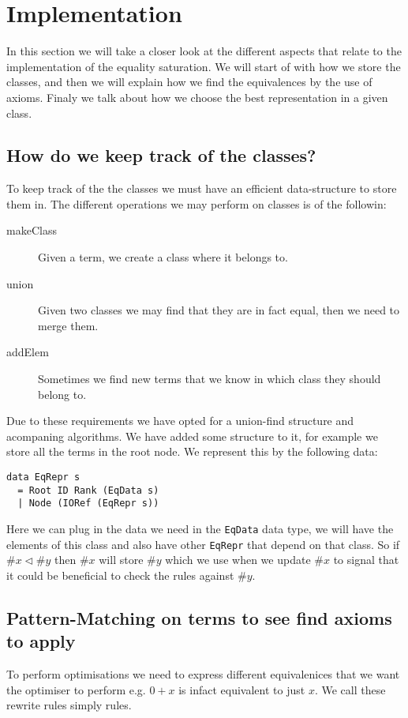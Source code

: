 
\section{Implementation}
In this section we will take a closer look at the different aspects that relate
to the implementation of the equality saturation. We will start of with how
we store the classes, and then we will explain how we find the equivalences by 
the use of axioms. Finaly we talk about how we choose the best representation in
a given class.
\subsection{How do we keep track of the classes?}
To keep track of the the classes we must have an efficient data-structure to store
them in. The different operations we may perform on classes is of the followin:

\begin{description}
  \item[makeClass] Given a term, we create a class where it belongs to.
  \item[union]     Given two classes we may find that they are in fact equal, then
                   we need to merge them.
  \item[addElem]   Sometimes we find new terms that we know in which class they
                   should belong to.
\end{description}

Due to these requirements we have opted for a union-find structure and acompaning
algorithms. We have added some structure to it, for example we store all the terms
in the root node. We represent this by the following data:

\begin{verbatim}
data EqRepr s
  = Root ID Rank (EqData s)
  | Node (IORef (EqRepr s))
\end{verbatim}

Here we can plug in the data we need in the \verb|EqData| data type, we will have
the elements of this class and also have other \verb|EqRepr| that depend on that
class. So if $\#x \lhd \#y$ then $\#x$ will store $\#y$ which we use when we update
$\#x$ to signal that it could be beneficial to check the rules against $\#y$.

\subsection{Pattern-Matching on terms to see find axioms to apply}
To perform optimisations we need to express different equivalenices that we want the optimiser to perform e.g. $0 + x$ is infact equivalent to just $x$. We call these rewrite rules simply rules.

